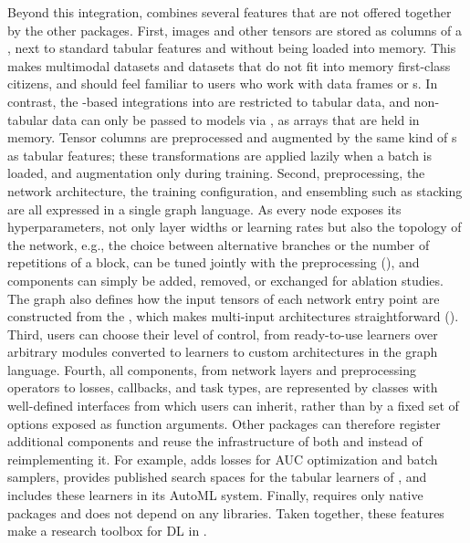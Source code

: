\documentclass[article,shortnames]{jss}
\theoremstyle{definition}
\begin{document}
Beyond this integration, \mlrttorch{} combines several features that are not offered together by the other \rlang{} packages.
First, images and other tensors are stored as  columns of a , next to standard tabular features and without being loaded into memory.
This makes multimodal datasets and datasets that do not fit into memory first-class citizens, and should feel familiar to \rlang{} users who work with data frames or s.
In contrast, the \torch{}-based integrations into \tidymodels{} are restricted to tabular data, and non-tabular data can only be passed to  models via , as arrays that are held in memory.
Tensor columns are preprocessed and augmented by the same kind of s as tabular features; these transformations are applied lazily when a batch is loaded, and augmentation only during training.
Second, preprocessing, the network architecture, the training configuration, and ensembling such as stacking are all expressed in a single graph language.
As every node exposes its hyperparameters, not only layer widths or learning rates but also the topology of the network, e.g., the choice between alternative branches or the number of repetitions of a block, can be tuned jointly with the preprocessing (), and components can simply be added, removed, or exchanged for ablation studies.
The graph also defines how the input tensors of each network entry point are constructed from the , which makes multi-input architectures straightforward ().
Third, users can choose their level of control, from ready-to-use learners over arbitrary \torch{} modules converted to learners to custom architectures in the graph language.
Fourth, all components, from network layers and preprocessing operators to losses, callbacks, and task types, are represented by classes with well-defined interfaces from which users can inherit, rather than by a fixed set of options exposed as function arguments.
Other packages can therefore register additional components and reuse the infrastructure of both \mlrt{} and \mlrttorch{} instead of reimplementing it.
For example,  \citep{ref-mlr3torchAUM} adds losses for AUC optimization and batch samplers,  \citep{ref-mlr3tuningspaces} provides published search spaces for the tabular learners of \mlrttorch{}, and  \citep{ref-mlr3automl} includes these learners in its AutoML system.
Finally, \mlrttorch{} requires only native \rlang{} packages and does not depend on any \python{} libraries.
Taken together, these features make \mlrttorch{} a research toolbox for DL in \rlang{}.
\end{document}
